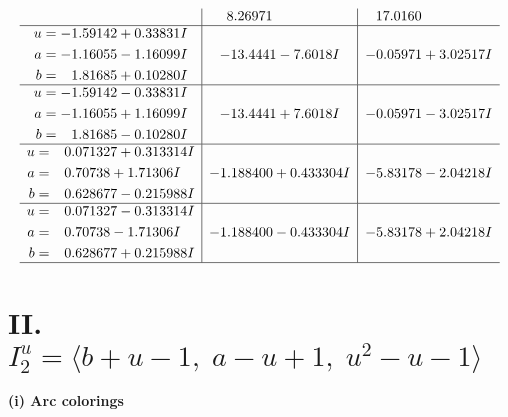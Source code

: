 \documentclass[1p]{elsarticle_modified}
\theoremstyle{definition}
\begin{document}
$$\begin{array}{c|c|c}
 & \phantom{-}8.26971\phantom{ +0.000000I} & \phantom{-}17.0160\phantom{ +0.000000I} \\ \hline\begin{aligned}
u &= -1.59142 + 0.33831 I \\
a &= -1.16055 - 1.16099 I \\
b &= \phantom{-}1.81685 + 0.10280 I\end{aligned}
 & -13.4441 - 7.6018 I & -0.05971 + 3.02517 I \\ \hline\begin{aligned}
u &= -1.59142 - 0.33831 I \\
a &= -1.16055 + 1.16099 I \\
b &= \phantom{-}1.81685 - 0.10280 I\end{aligned}
 & -13.4441 + 7.6018 I & -0.05971 - 3.02517 I \\ \hline\begin{aligned}
u &= \phantom{-}0.071327 + 0.313314 I \\
a &= \phantom{-}0.70738 + 1.71306 I \\
b &= \phantom{-}0.628677 - 0.215988 I\end{aligned}
 & -1.188400 + 0.433304 I & -5.83178 - 2.04218 I \\ \hline\begin{aligned}
u &= \phantom{-}0.071327 - 0.313314 I \\
a &= \phantom{-}0.70738 - 1.71306 I \\
b &= \phantom{-}0.628677 + 0.215988 I\end{aligned}
 & -1.188400 - 0.433304 I & -5.83178 + 2.04218 I\\
 \hline 
 \end{array}$$\newpage\newpage\renewcommand{\arraystretch}{1}
\centering \section*{II. $I^u_{2}= \langle b+u-1,\;a- u+1,\;u^2- u-1 \rangle$}
\flushleft \textbf{(i) Arc colorings}\\
\end{document}
